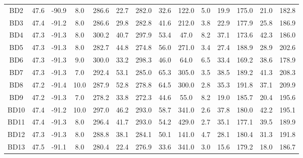 \documentclass[draft]{agujournal2019}
\begin{document}
\begin{table}
\begin{tabular}{cccccccccccccc}
BD2              & 47.6 & -90.9 & 8.0  & 286.6   & 22.7         & 282.0   & 32.6    & 122.0 & 5.0                     & 19.9        & 175.0       & 21.0         & 182.8        \\
BD3              & 47.4 & -91.2 & 8.0  & 286.6   & 29.8         & 282.8   & 41.6    & 212.0 & 3.8                     & 22.9        & 177.9       & 25.8         & 186.9        \\
BD4              & 47.3 & -91.3 & 8.0  & 300.2   & 40.7         & 297.9   & 53.4    & 47.0  & 8.2                     & 37.1        & 173.6       & 42.3         & 186.0        \\
BD5              & 47.3 & -91.3 & 8.0  & 282.7   & 44.8         & 274.8   & 56.0    & 271.0 & 3.4                     & 27.4        & 188.9       & 28.9         & 202.6        \\
BD6              & 47.3 & -91.3 & 9.0  & 300.0   & 33.2         & 298.3   & 46.0    & 64.0  & 6.5                     & 33.4        & 169.2       & 38.6         & 178.9        \\
BD7              & 47.3 & -91.3 & 7.0  & 292.4   & 53.1         & 285.0   & 65.3    & 305.0 & 3.5                     & 38.5        & 189.2       & 41.3         & 208.3        \\
BD8              & 47.2 & -91.4 & 10.0 & 287.9   & 52.8         & 278.8   & 64.5    & 300.0 & 2.8                     & 35.3        & 191.8       & 37.1         & 209.9        \\
BD9              & 47.2 & -91.3 & 7.0  & 278.2   & 33.8         & 272.3   & 44.6    & 55.0  & 8.2                     & 19.0        & 185.7       & 20.4         & 195.6        \\
BD10             & 47.4 & -91.2 & 10.0 & 297.0   & 46.2         & 293.0   & 58.7    & 341.0 & 2.6                     & 37.8        & 180.0       & 42.2         & 195.1        \\
BD11             & 47.4 & -91.3 & 8.0  & 296.4   & 41.7         & 293.0   & 54.2    & 429.0 & 2.7                     & 35.1        & 177.1       & 39.5         & 189.9        \\
BD12             & 47.3 & -91.3 & 8.0  & 288.8   & 38.1         & 284.1   & 50.1    & 141.0 & 4.7                     & 28.1        & 180.4       & 31.3         & 191.8        \\
BD13             & 47.5 & -91.1 & 8.0  & 280.4   & 22.4         & 276.9   & 33.6    & 341.0 & 3.0                     & 15.6        & 179.2       & 18.0         & 186.7        \\

\end{tabular}
\end{table}
\end{document}
